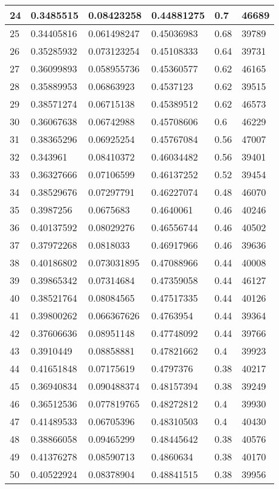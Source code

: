\begin{longtable}{|l|l|l|l|l|l|}
24 & 0.3485515 & 0.08423258 & 0.44881275 & 0.7 & 46689 \\ \hline 
25 & 0.34405816 & 0.061498247 & 0.45036983 & 0.68 & 39789 \\ \hline 
26 & 0.35285932 & 0.073123254 & 0.45108333 & 0.64 & 39731 \\ \hline 
27 & 0.36099893 & 0.058955736 & 0.45360577 & 0.62 & 46165 \\ \hline 
28 & 0.35889953 & 0.06863923 & 0.4537123 & 0.62 & 39515 \\ \hline 
29 & 0.38571274 & 0.06715138 & 0.45389512 & 0.62 & 46573 \\ \hline 
30 & 0.36067638 & 0.06742988 & 0.45708606 & 0.6 & 46229 \\ \hline 
31 & 0.38365296 & 0.06925254 & 0.45767084 & 0.56 & 47007 \\ \hline 
32 & 0.343961 & 0.08410372 & 0.46034482 & 0.56 & 39401 \\ \hline 
33 & 0.36327666 & 0.07106599 & 0.46137252 & 0.52 & 39454 \\ \hline 
34 & 0.38529676 & 0.07297791 & 0.46227074 & 0.48 & 46070 \\ \hline 
35 & 0.3987256 & 0.0675683 & 0.4640061 & 0.46 & 40246 \\ \hline 
36 & 0.40137592 & 0.08029276 & 0.46556744 & 0.46 & 40502 \\ \hline 
37 & 0.37972268 & 0.0818033 & 0.46917966 & 0.46 & 39636 \\ \hline 
38 & 0.40186802 & 0.073031895 & 0.47088966 & 0.44 & 40008 \\ \hline 
39 & 0.39865342 & 0.07314684 & 0.47359058 & 0.44 & 46127 \\ \hline 
40 & 0.38521764 & 0.08084565 & 0.47517335 & 0.44 & 40126 \\ \hline 
41 & 0.39800262 & 0.066367626 & 0.4763954 & 0.44 & 39364 \\ \hline 
42 & 0.37606636 & 0.08951148 & 0.47748092 & 0.44 & 39766 \\ \hline 
43 & 0.3910449 & 0.08858881 & 0.47821662 & 0.4 & 39923 \\ \hline 
44 & 0.41651848 & 0.07175619 & 0.4797376 & 0.38 & 40217 \\ \hline 
45 & 0.36940834 & 0.090488374 & 0.48157394 & 0.38 & 39249 \\ \hline 
46 & 0.36512536 & 0.077819765 & 0.48272812 & 0.4 & 39930 \\ \hline 
47 & 0.41489533 & 0.06705396 & 0.48310503 & 0.4 & 40430 \\ \hline 
48 & 0.38866058 & 0.09465299 & 0.48445642 & 0.38 & 40576 \\ \hline 
49 & 0.41376278 & 0.08590713 & 0.4860634 & 0.38 & 40170 \\ \hline 
50 & 0.40522924 & 0.08378904 & 0.48841515 & 0.38 & 39956 \\ \hline 
\end{longtable}